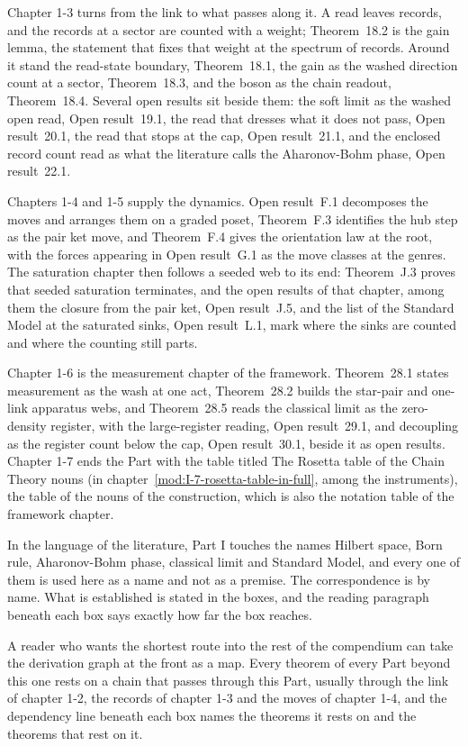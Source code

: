Chapter 1-3 turns from the link to what passes along it. A read leaves records, and the records at a sector are counted with a weight; Theorem~18.2 is the gain lemma, the statement that fixes that weight at the spectrum of records. Around it stand the read-state boundary, Theorem~18.1, the gain as the washed direction count at a sector, Theorem~18.3, and the boson as the chain readout, Theorem~18.4. Several open results sit beside them: the soft limit as the washed open read, Open result~19.1, the read that dresses what it does not pass, Open result~20.1, the read that stops at the cap, Open result~21.1, and the enclosed record count read as what the literature calls the Aharonov-Bohm phase, Open result~22.1.

Chapters 1-4 and 1-5 supply the dynamics. Open result~F.1 decomposes the moves and arranges them on a graded poset, Theorem~F.3 identifies the hub step as the pair ket move, and Theorem~F.4 gives the orientation law at the root, with the forces appearing in Open result~G.1 as the move classes at the genres. The saturation chapter then follows a seeded web to its end: Theorem~J.3 proves that seeded saturation terminates, and the open results of that chapter, among them the closure from the pair ket, Open result~J.5, and the list of the Standard Model at the saturated sinks, Open result~L.1, mark where the sinks are counted and where the counting still parts.

Chapter 1-6 is the measurement chapter of the framework. Theorem~28.1 states measurement as the wash at one act, Theorem~28.2 builds the star-pair and one-link apparatus webs, and Theorem~28.5 reads the classical limit as the zero-density register, with the large-register reading, Open result~29.1, and decoupling as the register count below the cap, Open result~30.1, beside it as open results. Chapter 1-7 ends the Part with the table titled The Rosetta table of the Chain Theory nouns (in chapter~\ref{mod:I-7-rosetta-table-in-full}, among the instruments), the table of the nouns of the construction, which is also the notation table of the framework chapter.

In the language of the literature, Part I touches the names Hilbert space, Born rule, Aharonov-Bohm phase, classical limit and Standard Model, and every one of them is used here as a name and not as a premise. The correspondence is by name. What is established is stated in the boxes, and the reading paragraph beneath each box says exactly how far the box reaches.

A reader who wants the shortest route into the rest of the compendium can take the derivation graph at the front as a map. Every theorem of every Part beyond this one rests on a chain that passes through this Part, usually through the link of chapter 1-2, the records of chapter 1-3 and the moves of chapter 1-4, and the dependency line beneath each box names the theorems it rests on and the theorems that rest on it.
